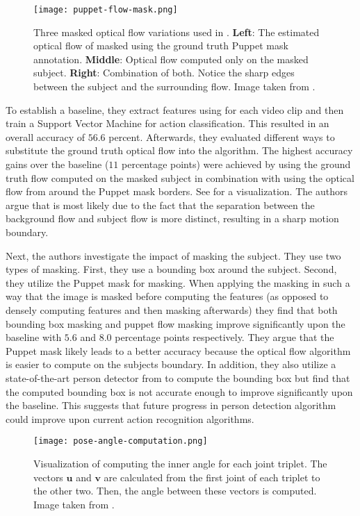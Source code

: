 \begin{figure}[htb!]
    \centering
    \texttt{[image: puppet-flow-mask.png]}
    \caption{Three masked optical flow variations used in \cite{jhuang_towards_2013}. \textbf{Left}: The estimated optical flow of \cite{wang_dense_2013} masked using the ground truth Puppet mask annotation. \textbf{Middle}: Optical flow computed only on the masked subject. \textbf{Right}: Combination of both. Notice the sharp edges between the subject and the surrounding flow. Image taken from \cite{jhuang_towards_2013}. }
    \label{fig:puppet-flow-mask}
\end{figure}

To establish a baseline, they extract features using \cite{wang_dense_2013} for each video clip and then train a Support Vector Machine for action classification.
This resulted in an overall accuracy of $56.6$ percent.
Afterwards, they evaluated different ways to substitute the ground truth optical flow into the algorithm.
The highest accuracy gains over the baseline ($11$ percentage points) were achieved by using the ground truth flow computed on the masked subject in combination with using the optical flow from around the Puppet mask borders.
See  for a visualization.
The authors argue that is most likely due to the fact that the separation between the background flow and subject flow is more distinct, resulting in a sharp motion boundary. 

Next, the authors investigate the impact of masking the subject. 
They use two types of masking. First, they use a bounding box around the subject. Second, they utilize the Puppet mask for masking. 
When applying the masking in such a way that the image is masked before computing the features (as opposed to densely computing features and then masking afterwards) they find that both bounding box masking and puppet flow masking improve significantly upon the baseline with $5.6$ and $8.0$ percentage points respectively.
They argue that the Puppet mask likely leads to a better accuracy because the optical flow algorithm is easier to compute on the subjects boundary.
In addition, they also utilize a state-of-the-art person detector from \cite{bourdev_detecting_2010} to compute the bounding box but find that the computed bounding box is not accurate enough to improve significantly upon the baseline.
This suggests that future progress in person detection algorithm could improve upon current action recognition algorithms.

\begin{figure}[htb!]
    \centering
    \texttt{[image: pose-angle-computation.png]}
    \caption{Visualization of computing the inner angle for each joint triplet. The vectors $\bm{u}$ and $\bm{v}$ are calculated from the first joint of each triplet to the other two. Then, the angle between these vectors is computed. Image taken from \cite{jhuang_towards_2013}. }
    \label{fig:joint-angle-computation}
\end{figure}

